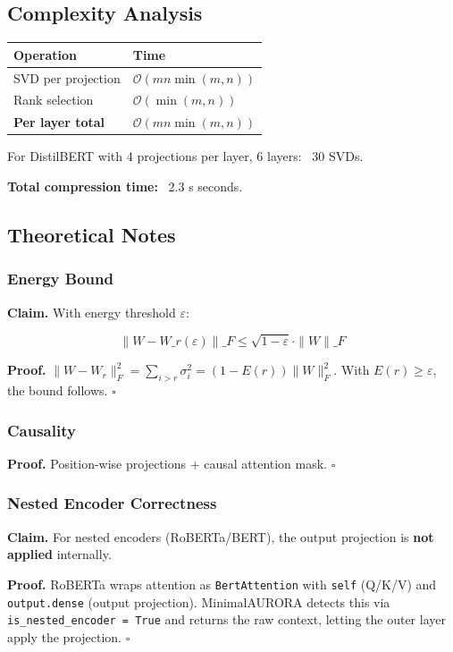 \subsection{Complexity Analysis}

\begin{table}[H]
\centering
\small
\begin{tabular}{ll}
\toprule
\textbf{Operation} & \textbf{Time} \\
\midrule
SVD per projection & $\mathcal{O}(mn \min(m,n))$ \\
Rank selection & $\mathcal{O}(\min(m,n))$ \\
\textbf{Per layer total} & $\mathcal{O}(mn \min(m,n))$ \\
\bottomrule
\end{tabular}
\end{table}

For DistilBERT with 4 projections per layer, 6 layers: ~30 SVDs.

\textbf{Total compression time:} ~2.3 s seconds.

\subsection{Theoretical Notes}

\subsubsection{Energy Bound}

\textbf{Claim.} With energy threshold $\varepsilon$:

\[
\|W - W\_{r(\varepsilon)}\|\_F \leq \sqrt{1 - \varepsilon} \cdot \|W\|\_F
\tag{4.5}
\]

\textbf{Proof.} $\|W - W_r\|_F^2 = \sum_{i > r} \sigma_i^2 = (1 - E(r)) \|W\|_F^2$. 
With $E(r) \geq \varepsilon$, the bound follows. $\square$

\subsubsection{Causality}

\textbf{Proof.} Position-wise projections + causal attention mask. $\square$

\subsubsection{Nested Encoder Correctness}

\textbf{Claim.} For nested encoders (RoBERTa/BERT), the output projection is 
\textbf{not applied} internally.

\textbf{Proof.} RoBERTa wraps attention as \texttt{BertAttention} with \texttt{self} (Q/K/V) 
and \texttt{output.dense} (output projection). MinimalAURORA detects this via 
\texttt{is\_nested\_encoder = True} and returns the raw context, letting the outer 
layer apply the projection. $\square$

